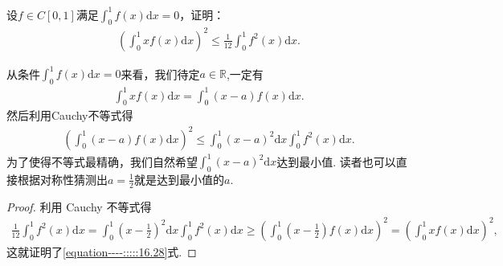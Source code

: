 \documentclass[../../main.tex]{subfiles}%
\begin{document}
\begin{example}
设\(f \in C[0,1]\)满足\(\int_{0}^{1}f(x)\mathrm{d}x = 0\)，证明：
\begin{align}
\left(\int_{0}^{1}xf(x)\mathrm{d}x\right)^2 \leqslant \frac{1}{12}\int_{0}^{1}f^{2}(x)\mathrm{d}x. \label{equation----:::::16.28}
\end{align}
\end{example}
\begin{note}
从条件\(\int_{0}^{1}f(x)\mathrm{d}x = 0\)来看，我们待定\(a \in \mathbb{R}\),一定有
\begin{align*}
\int_{0}^{1}xf(x)\mathrm{d}x = \int_{0}^{1}(x - a)f(x)\mathrm{d}x.
\end{align*}
然后利用Cauchy不等式得
\begin{align*}
\left(\int_{0}^{1}(x - a)f(x)\mathrm{d}x\right)^2 \leqslant \int_{0}^{1}(x - a)^2\mathrm{d}x\int_{0}^{1}f^{2}(x)\mathrm{d}x.
\end{align*}
为了使得不等式最精确，我们自然希望\(\int_{0}^{1}(x - a)^2\mathrm{d}x\)达到最小值. 读者也可以直接根据对称性猜测出\(a = \frac{1}{2}\)就是达到最小值的\(a\).
\end{note}
\begin{proof}

利用 Cauchy 不等式得
\begin{align*}
\frac{1}{12}\int_{0}^{1}f^{2}(x)\mathrm{d}x=\int_{0}^{1}\left(x - \frac{1}{2}\right)^2\mathrm{d}x\int_{0}^{1}f^{2}(x)\mathrm{d}x\geqslant \left(\int_{0}^{1}\left(x - \frac{1}{2}\right)f(x)\mathrm{d}x\right)^2=\left(\int_{0}^{1}xf(x)\mathrm{d}x\right)^2,
\end{align*}
这就证明了\eqref{equation----:::::16.28}式.

\end{proof}
\end{document}
